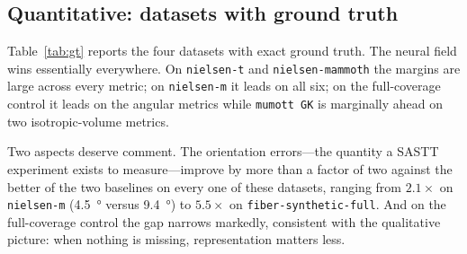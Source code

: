 \documentclass[11pt,a4paper]{article}
\begin{document}
\subsection{Quantitative: datasets with ground truth}

Table~\ref{tab:gt} reports the four datasets with exact ground truth. The neural field wins
essentially everywhere. On \texttt{nielsen-t} and \texttt{nielsen-mammoth} the margins are
large across every metric; on \texttt{nielsen-m} it leads on all six; on the full-coverage
control it leads on the angular metrics while \texttt{mumott GK} is marginally ahead on two
isotropic-volume metrics.

Two aspects deserve comment. The orientation errors---the quantity a SASTT experiment
exists to measure---improve by more than a factor of two against the better of the two
baselines on every one of these datasets, ranging from $2.1\times$ on \texttt{nielsen-m}
(\SI{4.5}{\degree} versus \SI{9.4}{\degree}) to $5.5\times$ on
\texttt{fiber-synthetic-full}. And on the full-coverage control the
gap narrows markedly, consistent with the qualitative picture: when nothing is missing,
representation matters less.
\end{document}
